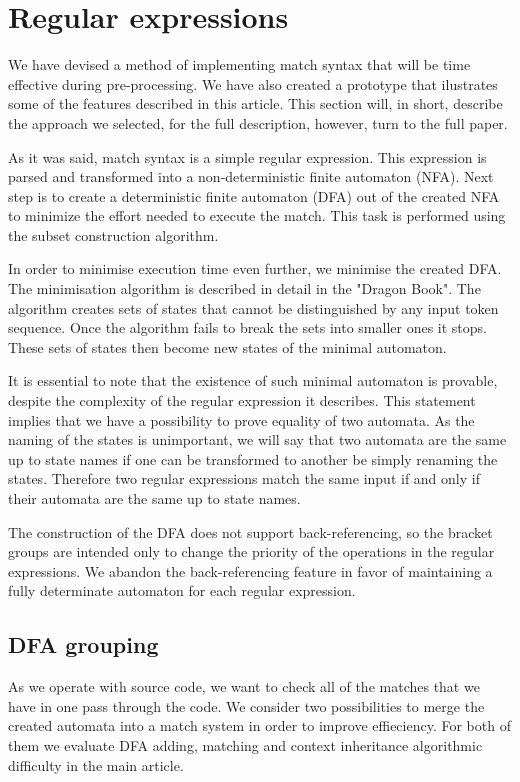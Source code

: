 \section{\label{sec:regexps}Regular expressions}

We have devised a method of implementing match syntax that will be time
effective during pre-processing. We have also created a prototype that
ilustrates some of the features described in this article. This section will,
in short, describe the approach we selected, for the full description, however,
turn to the full paper.

As it was said, match syntax is a simple regular expression. This expression is
parsed and transformed into a non-deterministic finite automaton (NFA). Next
step is to create a deterministic finite automaton (DFA) out of the created NFA
to minimize the effort needed to execute the match. This task is performed
using the subset construction algorithm.

In order to minimise execution time even further, we minimise the created DFA.
The minimisation algorithm is described in detail in the "Dragon
Book"\cite{dragon-book}. The algorithm creates sets of states that cannot be
distinguished by any input token sequence. Once the algorithm fails to break
the sets into smaller ones it stops. These sets of states then become new
states of the minimal automaton.

It is essential to note that the existence of such minimal automaton is
provable, despite the complexity of the regular expression it describes. This
statement implies that we have a possibility to prove equality of two automata.
As the naming of the states is unimportant, we will say that two automata are
the same up to state names if one can be transformed to another be simply
renaming the states. Therefore two regular expressions match the same input if
and only if their automata are the same up to state names.

The construction of the DFA does not support back-referencing, so the bracket
groups are intended only to change the priority of the operations in the
regular expressions. We abandon the back-referencing feature in favor of
maintaining a fully determinate automaton for each regular expression.

\subsection{DFA grouping}
As we operate with source code, we want to check all of the matches that we
have in one pass through the code. We consider two possibilities to merge the
created automata into a match system in order to improve effieciency. For both
of them we evaluate DFA adding, matching and context inheritance algorithmic
difficulty in the main article.

